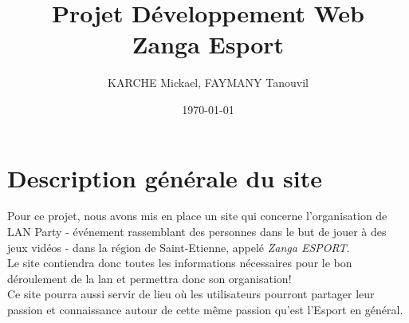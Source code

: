 \documentclass[a4paper, 11pt]{article}
\title{Projet Développement Web\\Zanga Esport}
\author{KARCHE Mickael, FAYMANY Tanouvil}
\date{\today}
\begin{document}
\maketitle

\newpage
\tableofcontents
\newpage



\section{Description générale du site}
Pour ce projet, nous avons mis en place un site qui concerne l'organisation de LAN Party - événement rassemblant des personnes dans le but de jouer
à des jeux vidéos - dans la région de Saint-Etienne, appelé \textit{Zanga ESPORT}.\\
Le site contiendra donc toutes les informations nécessaires pour le bon déroulement de la lan et permettra donc son organisation!\\
Ce site pourra aussi servir de lieu où les utilisateurs pourront partager leur passion et connaissance autour de cette même passion qu'est l'Esport en
général.
\end{document}
